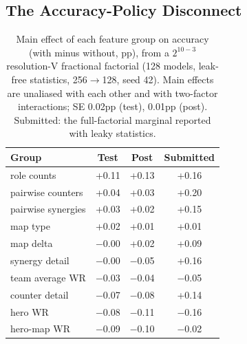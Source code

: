 \documentclass[journal]{IEEEtran}
\providecommand{\DIFaddtex}[1]{{\protect\color{blue} \sf #1}} %
\providecommand{\DIFdeltex}[1]{{\protect\color{red} \scriptsize #1}} %
\providecommand{\DIFaddbegin}{} %
\providecommand{\DIFaddend}{} %
\providecommand{\DIFdelbegin}{} %
\providecommand{\DIFdelend}{} %
\providecommand{\DIFaddFL}[1]{\DIFadd{#1}} %
\providecommand{\DIFadd}[1]{\texorpdfstring{\DIFaddtex{#1}}{#1}} %
\providecommand{\DIFdel}[1]{\texorpdfstring{\DIFdeltex{#1}}{}} %
\begin{document}
\DIFdelbegin \subsection{\DIFdel{The Accuracy-Policy Disconnect}}
\addtocounter{subsection}{-1}%
\DIFdelend \DIFaddbegin \begin{table}[t]
\centering
\caption{\DIFaddFL{Main effect of each feature group on accuracy (with minus without, pp), from a $2^{10-3}$ resolution-V fractional factorial (128 models, leak-free statistics, 256$\to$128, seed 42). Main effects are unaliased with each other and with two-factor interactions; SE 0.02pp (test), 0.01pp (post). Submitted: the full-factorial marginal reported with leaky statistics.}}
\label{tab:sweep}
\setlength{\tabcolsep}{4pt}
\begin{tabular}{lccc}
\toprule
Group & Test & Post & Submitted \\
\midrule
role counts & +0.11 & +0.13 & +0.16 \\
pairwise counters & +0.04 & +0.03 & +0.20 \\
pairwise synergies & +0.03 & +0.02 & +0.15 \\
map type & +0.02 & +0.01 & +0.01 \\
map delta & $-$0.00 & +0.02 & +0.09 \\
synergy detail & $-$0.00 & $-$0.05 & +0.16 \\
team average WR & $-$0.03 & $-$0.04 & $-$0.05 \\
counter detail & $-$0.07 & $-$0.08 & +0.14 \\
hero WR & $-$0.08 & $-$0.11 & $-$0.16 \\
hero-map WR & $-$0.09 & $-$0.10 & $-$0.02 \\
\bottomrule
\end{tabular}
\end{table}
\DIFaddend 
\end{document}
